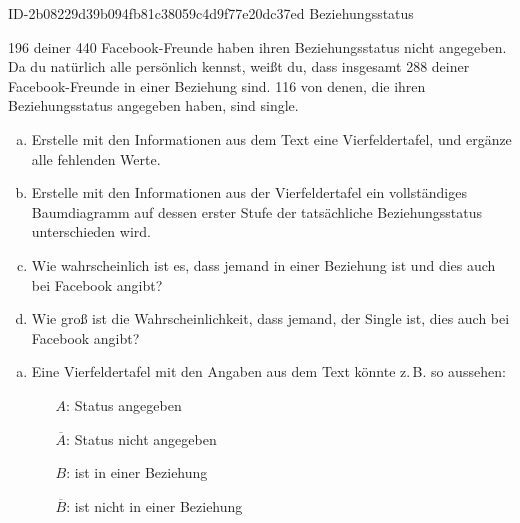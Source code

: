 \begin{exercise}
      {ID-2b08229d39b094fb81c38059c4d9f77e20dc37ed}
      {Beziehungsstatus}
  \ifproblem\problem\par
    \num{196} deiner \num{440} Facebook-Freunde haben ihren Beziehungsstatus nicht angegeben.
    Da du natürlich alle persönlich kennst, weißt du, dass insgesamt \num{288} deiner
    Face\-book-Freunde in einer Beziehung sind. \num{116} von denen, die ihren
    Beziehungsstatus angegeben haben, sind single.
    \begin{enumerate}[a)]
      \item Erstelle mit den Informationen aus dem Text eine Vierfeldertafel,
            und ergänze alle fehlenden Werte.
      \item Erstelle mit den Informationen aus der Vierfeldertafel ein
            vollständiges Baumdiagramm auf dessen erster Stufe der
            tatsächliche Beziehungsstatus unterschieden wird.
      \item Wie wahrscheinlich ist es, dass jemand in einer Beziehung
            ist und dies auch bei Facebook angibt?
      \item Wie groß ist die Wahrscheinlichkeit, dass jemand, der Single ist,
            dies auch bei Facebook angibt?
    \end{enumerate}
  \fi
  \ifoutline\outline\par
    \begin{enumerate}[a)]
      \item Eine Vierfeldertafel mit den Angaben aus dem Text
            könnte z.\,B. so aussehen:
            \begin{center}
              \begin{minipage}{0.36\linewidth}
                \begin{itemize}
                  \setlength{\leftskip}{0pt}%
                  \setlength{\itemsep}{-0.1\baselineskip}%
                  \item[$A$:]            Status angegeben
                  \item[$\overline{A}$:] Status nicht angegeben
                  \item[$B$:]            ist in einer Beziehung
                  \item[$\overline{B}$:] ist nicht in einer Beziehung
                \end{itemize}
              \end{minipage}
              \qquad
              \begin{fourfoldtable}

\end{fourfoldtable}
\end{center}
\end{enumerate}
\end{exercise}

